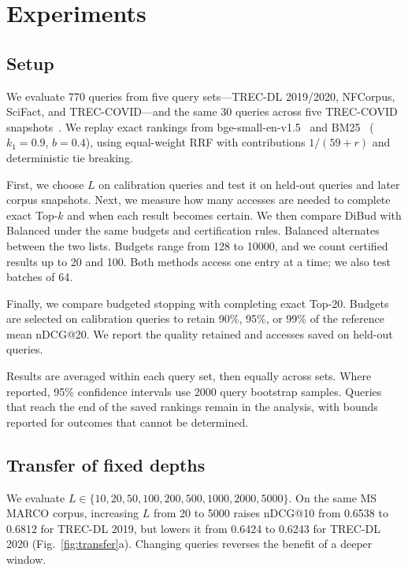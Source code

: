 \section{Experiments}
\label{sec:experiments}
\subsection{Setup}
We evaluate 770 queries from five query sets---TREC-DL 2019/2020, NFCorpus, SciFact, and TREC-COVID---and the same 30 queries across five TREC-COVID snapshots~\cite{dl19,dl20,nfcorpus,scifact,covid}. We replay exact rankings from bge-small-en-v1.5~\cite{bge} and BM25~\cite{bm25} ($k_1=0.9$, $b=0.4$), using equal-weight RRF with contributions $1/(59+r)$ and deterministic tie breaking.

First, we choose $L$ on calibration queries and test it on held-out queries and later corpus snapshots. Next, we measure how many accesses are needed to complete exact Top-$k$ and when each result becomes certain. We then compare DiBud with Balanced under the same budgets and certification rules. Balanced alternates between the two lists. Budgets range from 128 to 10000, and we count certified results up to 20 and 100. Both methods access one entry at a time; we also test batches of 64.

Finally, we compare budgeted stopping with completing exact Top-20. Budgets are selected on calibration queries to retain 90\%, 95\%, or 99\% of the reference mean nDCG@20. We report the quality retained and accesses saved on held-out queries.

Results are averaged within each query set, then equally across sets. Where reported, 95\% confidence intervals use 2000 query bootstrap samples. Queries that reach the end of the saved rankings remain in the analysis, with bounds reported for outcomes that cannot be determined.

\subsection{Transfer of fixed depths}
We evaluate $L\in\{10,\allowbreak20,\allowbreak50,\allowbreak100,\allowbreak200,\allowbreak500,\allowbreak1000,\allowbreak2000,\allowbreak5000\}$. On the same MS MARCO corpus, increasing $L$ from 20 to 5000 raises nDCG@10 from 0.6538 to 0.6812 for TREC-DL 2019, but lowers it from 0.6424 to 0.6243 for TREC-DL 2020 (Fig.~\ref{fig:transfer}a). Changing queries reverses the benefit of a deeper window.

